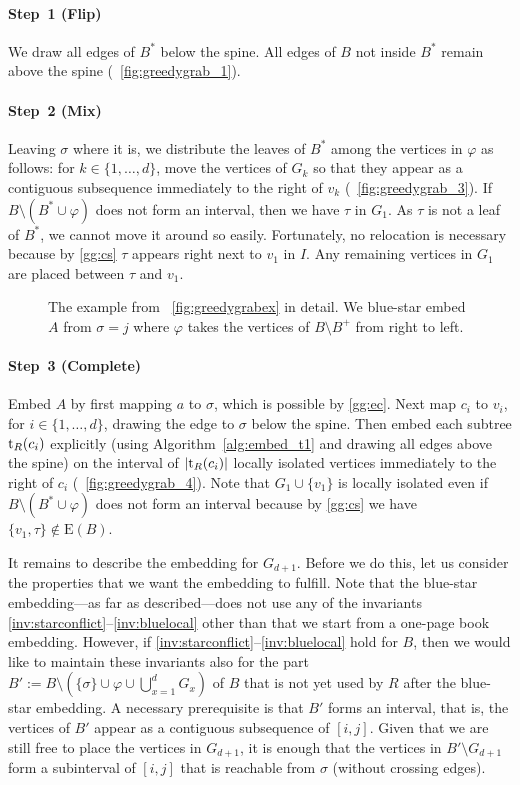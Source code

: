 \documentclass[11pt,a4paper,colorlinks=true,urlcolor=blue,citecolor=red]{article}
\theoremstyle{plain}
\newcommand{\subsubparagraph}[1]{\paragraph{#1}}
\newcommand{\EB}{\mathrm{E}(B)}
\begin{document}
\subsubparagraph{Step~1 (Flip)} We draw all edges of $B^*$ below the
spine. All edges of $B$ not inside $B^*$ remain above the spine
(\figurename~\ref{fig:greedygrab_1}).

\subsubparagraph{Step~2 (Mix)} Leaving $\sigma$ where it is, we
distribute the leaves of $B^*$ among the vertices in $\varphi$ as
follows: for $k\in\{1,\ldots,d\}$, move the vertices of $G_k$ so that
they appear as a contiguous subsequence immediately to the right of
$v_k$ (\figurename~\ref{fig:greedygrab_3}). If
$B\setminus(B^*\cup\varphi)$ does not form an interval, then we have
$\tau$ in $G_1$. As $\tau$ is not a leaf of $B^*$, we cannot move it
around so easily. Fortunately, no relocation is necessary because by
\ref{gg:cs} $\tau$ appears right next to $v_1$ in $I$. Any
remaining vertices in $G_1$ are placed between $\tau$ and $v_1$.
\begin{figure}[htbp]
  \centering\hfil {}\hfil
  \hfil
  \hfil
  \hfil
  \caption{The example from \figurename~\ref{fig:greedygrabex} in
    detail. We blue-star embed $A$ from $\sigma=j$ where $\varphi$
    takes the vertices of $B\setminus B^+$ from right to
    left.\label{fig:greedygrab}}
\end{figure}


\subsubparagraph{Step~3 (Complete)} Embed $A$ by first mapping $a$ to
$\sigma$, which is possible by \ref{gg:ec}. Next map $c_i$ to $v_i$, for
$i\in\{1,\ldots,d\}$, drawing the edge to $\sigma$ below the spine. Then
embed each subtree $\mathrm t_R(c_i)$ explicitly (using
Algorithm~\ref{alg:embed_t1} and drawing all edges above the spine) on
the interval of $|\mathrm t_R(c_i)|$ locally isolated vertices immediately to
the right of $c_i$ (\figurename~\ref{fig:greedygrab_4}). Note that
$G_1\cup\{v_1\}$ is locally isolated even if
$B\setminus(B^*\cup\varphi)$ does not form an interval because by
\ref{gg:cs} we have $\{v_1,\tau\}\notin\EB$.

It remains to describe the embedding for $G_{d+1}$. Before we do this,
let us consider the properties that we want the embedding to fulfill.
Note that the blue-star embedding---as far as described---does not use
any of the invariants \ref{inv:starconflict}--\ref{inv:bluelocal} other
than that we start from a one-page book embedding. However, if
\ref{inv:starconflict}--\ref{inv:bluelocal} hold for $B$, then we would
like to maintain these invariants also for the part
$B':=B\setminus(\{\sigma\}\cup\varphi\cup\bigcup_{x=1}^d{G_x})$ of $B$
that is not yet used by $R$ after the blue-star embedding. A necessary
prerequisite is that $B'$ forms an interval, that is, the vertices of
$B'$ appear as a contiguous subsequence of $[i,j]$. Given that we are
still free to place the vertices in $G_{d+1}$, it is enough that the
vertices in $B'\setminus G_{d+1}$ form a subinterval of $[i,j]$ that is
reachable from $\sigma$ (without crossing edges).
\end{document}
